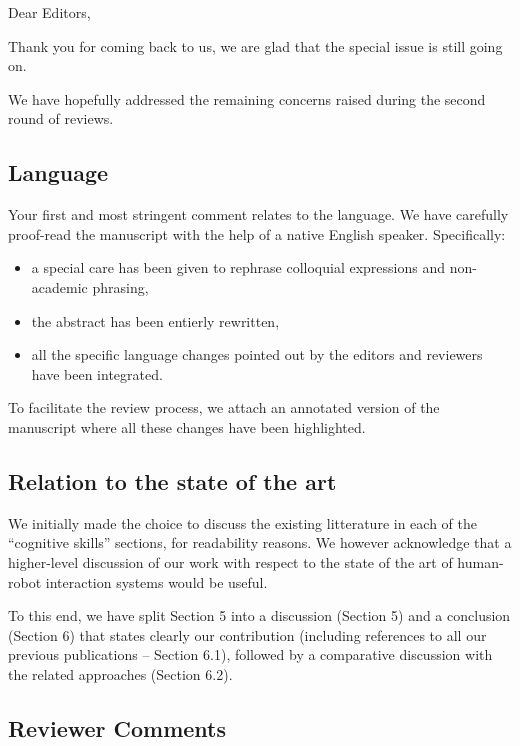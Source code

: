 \documentclass{article}
\begin{document}
Dear Editors,

\vspace{2em}

Thank you for coming back to us, we are glad that the special issue is still
going on.

We have hopefully addressed the remaining concerns raised during the second
round of reviews.

\subsection*{Language}

Your first and most stringent comment relates to the language. We have carefully
proof-read the manuscript with the help of a native English speaker.
Specifically:

\begin{itemize}
    \item a special care has been given to rephrase colloquial expressions and
        non-academic phrasing,
    \item the abstract has been entierly rewritten,
    \item all the specific language changes pointed out by the editors and
        reviewers have been integrated.
\end{itemize}

To facilitate the review process, we attach an annotated version of the
manuscript where all these changes have been highlighted.

\subsection*{Relation to the state of the art}

We initially made the choice to discuss the existing litterature in each of the
``cognitive skills'' sections, for readability reasons. We however acknowledge
that a higher-level discussion of our work with respect to the state of the art
of human-robot interaction systems would be useful.

To this end, we have split Section 5 into a discussion (Section 5) and a
conclusion (Section 6) that states clearly our contribution (including
references to all our previous publications -- Section 6.1), followed by a
comparative discussion with the related approaches (Section 6.2).

\subsection*{Reviewer Comments}
\end{document}
